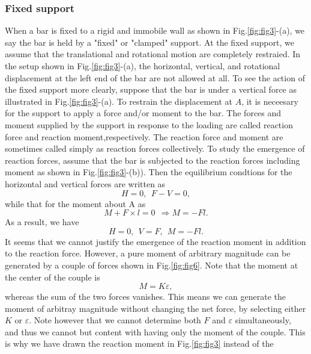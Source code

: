 \documentclass[10pt,a4j]{article}
\begin{document}
\subsubsection{Fixed support}
When a bar is fixed to a rigid and immobile wall as shown in Fig.\ref{fig:fig3}-(a), 
we say the bar is held by a "fixed" or "clamped" support. At the fixed support, 
we assume that the translational and rotational motion are completely restraied. 
In the setup shown in Fig.\ref{fig:fig3}-(a), the horizontal, vertical, 
and rotational displacement at the left end of the bar are not allowed 
at all. To see the action of the fixed support more clearly,
suppose that the bar is under a vertical force as illustrated in Fig.\ref{fig:fig3}-(a).
To restrain the displacement at $A$, it is neceesary for the support to apply 
a force and/or moment to the bar. 
The forces and moment supplied by the support in response to the loading are called 
reaction force and reaction moment,respectively. 
The reaction force and moment are sometimes called simply as reaction forces collectively. 
To study the emergence of reaction forces, assume that the bar is subjected to the 
reaction forces including moment as shown in Fig.\ref{fig:fig3}-(b)).
Then the equilibrium condtions for the horizontal and vertical forces are written as 
\begin{equation}
	H=0, \ \ F-V=0, 
	\label{eqn:}
\end{equation}
while that for the moment about A as 
\begin{equation}
	M+F\times l =0 \ \ \Rightarrow M=-Fl.
	\label{eqn:}
\end{equation}
As a result, we have 
\begin{equation}
	H=0, \ \ V=F, \ \ M=-Fl. 
	\label{eqn:}
\end{equation}
It seems that we cannot justify the emergence of the reaction moment 
in addition to the reaction force. However, a pure moment of arbitrary magnitude 
can be generated by a couple of forces shown in Fig.\ref{fig:fig6}. 
Note that the moment at the center of the couple is 
\begin{equation}
	M=K\varepsilon, 
	\label{eqn:}
\end{equation}
whereas the sum of the two forces vanishes. 
This means we can generate the moment of arbitray magnitude without changing the net force, 
by selecting either $K$ or $\varepsilon$.
Note however that we cannot determine both $F$ and $\varepsilon$ simultaneously, and thus 
we cannot but content with having only the moment of the couple. 
This is why we have drawn the reaction moment in Fig.\ref{fig:fig3} instead of the 
\end{document}
